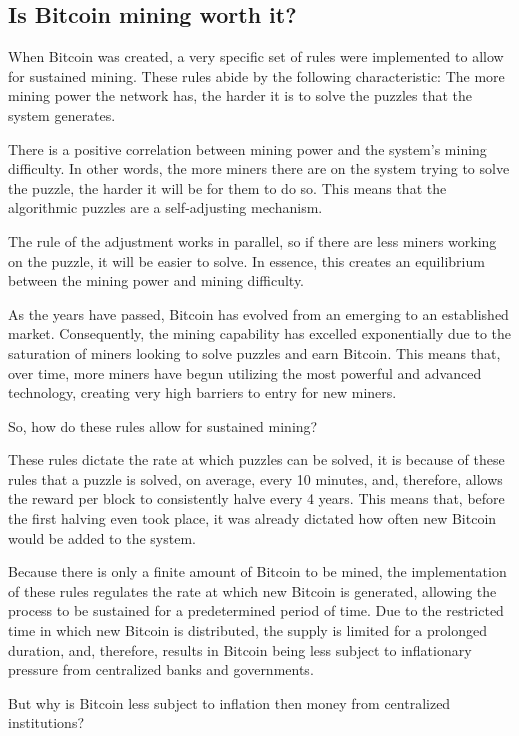 \documentclass{article}
\newcommand\tab[1][1cm]{\hspace*{#1}}
\begin{document}
 \subsection{Is Bitcoin mining worth it?}
 
 \tab When Bitcoin was created, a very specific set of rules were implemented to allow for sustained mining. These rules abide by the following characteristic: The more mining power the network has, the harder it is to solve the puzzles that the system generates.
 
 There is a positive correlation between mining power and the system's mining difficulty. In other words, the more miners there are on the system trying to solve the puzzle, the harder it will be for them to do so. This means that the algorithmic puzzles are a self-adjusting mechanism.
 
 The rule of the adjustment works in parallel, so if there are less miners working on the puzzle, it will be easier to solve. In essence, this creates an equilibrium between the mining power and mining difficulty.
 
 As the years have passed, Bitcoin has evolved from an emerging to an established market. Consequently, the mining capability has excelled exponentially due to the saturation of miners looking to solve puzzles and earn Bitcoin. This means that, over time, more miners have begun utilizing the most powerful and advanced technology, creating very high barriers to entry for new miners.
 
 So, how do these rules allow for sustained mining? 
 
 These rules dictate the rate at which puzzles can be solved, it is because of these rules that a puzzle is solved, on average, every 10 minutes, and, therefore, allows the reward per block to consistently halve every 4 years. This means that, before the first halving even took place, it was already dictated how often new Bitcoin would be added to the system.
 
 Because there is only a finite amount of Bitcoin to be mined, the implementation of these rules regulates the rate at which new Bitcoin is generated, allowing the process to be sustained for a predetermined period of time. Due to the restricted time in which new Bitcoin is distributed, the supply is limited for a prolonged duration, and, therefore, results in Bitcoin being less subject to inflationary pressure from centralized banks and governments. 
 
 But why is Bitcoin less subject to inflation then money from centralized institutions?
 
\end{document}
